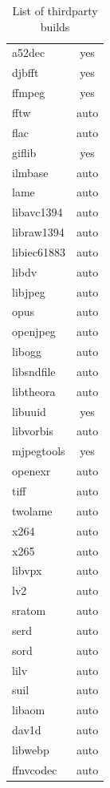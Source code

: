 \begin{center}
	\small
	\begin{longtable}{m{8em} c}		
		\caption{List of thirdparty builds}
		\label{tab:List_of_thirdparty_builds}\\
		\toprule
		a52dec   & yes\\
		djbfft   & yes\\
		ffmpeg   & yes\\
		fftw     & auto\\
		flac     & auto\\
		giflib   & yes\\
		ilmbase	 & auto\\
		lame     & auto\\
		libavc1394&auto\\
		libraw1394&auto\\
		libiec61883&auto\\
		libdv     &auto\\
		libjpeg   &auto\\
		opus	  &auto\\
		openjpeg  &auto\\
		libogg    &auto\\
		libsndfile&auto\\
		libtheora&auto\\
		libuuid  & yes\\
		libvorbis&auto\\
		mjpegtools&yes\\
		openexr   &auto\\
		tiff      &auto\\
		twolame   &auto\\
		x264      &auto\\
		x265      &auto\\
		libvpx    &auto\\
		lv2       &auto\\
		sratom    &auto\\
		serd      &auto\\
		sord      &auto\\
		lilv      &auto\\
		suil      &auto\\
		libaom    &auto\\
		dav1d     &auto\\
		libwebp   &auto\\
		ffnvcodec &auto\\
		\bottomrule
	\end{longtable}
\end{center}

